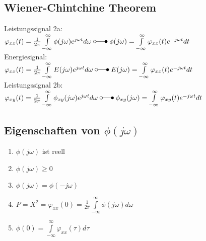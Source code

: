 \begin{minipage}[]{10cm}
\subsection{Wiener-Chintchine Theorem }
	Leistungssignal 2a: \\
	$\varphi_{xx}(t) = \frac{1}{2\pi}\int\limits_{-\infty}^{\infty}\phi(j\omega)e^{j\omega t}d\omega \; \laplace \; \phi(j\omega) = \int\limits_{-\infty}^{\infty}\varphi_{xx}(t)e^{-j\omega t} dt \nonumber $\\
	Energiesignal: \\
	$\varphi_{xx}(t) = \frac{1}{2\pi}\int\limits_{-\infty}^{\infty}E(j\omega)e^{j\omega t}d\omega \; \laplace \; E(j\omega) = \int\limits_{-\infty}^{\infty}\varphi_{xx}(t)e^{-j\omega t} dt \nonumber $\\
	Leistungssignal 2b: \\
	$\varphi_{xy}(t) = \frac{1}{2\pi}\int\limits_{-\infty}^{\infty}\phi_{xy}(j\omega)e^{j\omega t}d\omega \; \laplace \;
	\phi_{xy}(j\omega) = \int\limits_{-\infty}^{\infty}\varphi_{xy}(t)e^{-j\omega t} dt \nonumber$
\end{minipage}
\begin{minipage}[]{8cm}
\subsection{Eigenschaften von $\phi(j\omega)$}
	\begin{enumerate}
		\item	$\phi(j\omega)$ ist reell
		\item $\phi(j\omega) \geq 0$
		\item $\phi(j\omega) = \phi(-j\omega)$
		\item $P = X^2 = \varphi_{xx}(0) = \frac{1}{2\pi} \int\limits_{-\infty}^{\infty} \phi(j\omega) d\omega$
		\item $\phi(0) = \int\limits_{-\infty}^{\infty} \varphi_{xx}(\tau)d\tau$
	\end{enumerate}
\end{minipage}